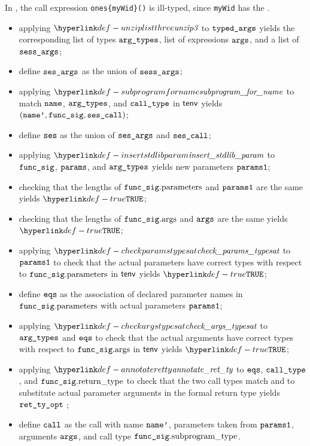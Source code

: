 In , the call expression \verb|ones{myWid}()|
is ill-typed, since \verb|myWid| has the \unconstrainedintegertype.

\ProseParagraph
\AllApply
\begin{itemize}
  \item applying $\unziplistthree$ to $\texttt{typed\_args}$ yields the corresponding list of types $\texttt{arg\_types}$,
        list of expressions $\texttt{args}$, and a list of \sideeffectdescriptorsetsterm\ $\texttt{sess\_args}$;
  \item define $\texttt{ses\_args}$ as the union of $\texttt{sess\_args}$;
  \item applying $\subprogramforname$ to match $\texttt{name}$, $\texttt{arg\_types}$, and $\texttt{call\_type}$ in $\textsf{tenv}$
        yields $(\texttt{name'}, \texttt{func\_sig}, \texttt{ses\_call})$\ProseOrTypeError;
  \item define $\texttt{ses}$ as the union of $\texttt{ses\_args}$ and $\texttt{ses\_call}$;
  \item applying $\insertstdlibparam$ to $\texttt{func\_sig}$, $\texttt{params}$, and $\texttt{arg\_types}$ yields new parameters $\texttt{params1}$;
  \item checking that the lengths of $\texttt{func\_sig}.\text{parameters}$ and $\texttt{params1}$ are the same yields $\True$\ProseTerminateAs{\BadCall};
  \item checking that the lengths of $\texttt{func\_sig}.\text{args}$ and $\texttt{args}$ are the same yields $\True$\ProseTerminateAs{\BadCall};
  \item applying $\checkparamstypesat$ to $\texttt{params1}$
        to check that the actual parameters have correct types with respect to $\texttt{func\_sig}.\text{parameters}$
        in $\textsf{tenv}$ yields $\True$\ProseOrTypeError;
  \item define $\texttt{eqs}$ as the association of declared parameter names in $\texttt{func\_sig}.\text{parameters}$ with actual parameters $\texttt{params1}$;
  \item applying $\checkargstypesat$ to $\texttt{arg\_types}$ and $\texttt{eqs}$
        to check that the actual arguments have correct types with respect to $\texttt{func\_sig}.\text{args}$
        in $\textsf{tenv}$ yields $\True$\ProseOrTypeError;
  \item applying $\annotateretty$ to $\texttt{eqs}$, $\texttt{call\_type}$, and $\texttt{func\_sig}.\text{return\_type}$
        to check that the two call types match and to substitute actual parameter arguments in the formal return type
        yields $\texttt{ret\_ty\_opt}$ \ProseOrTypeError;
  \item define $\texttt{call}$ as the call with name $\texttt{name'}$, parameters taken from $\texttt{params1}$, arguments $\texttt{args}$,
        and call type $\texttt{func\_sig}.\text{subprogram\_type}$.
\end{itemize}

